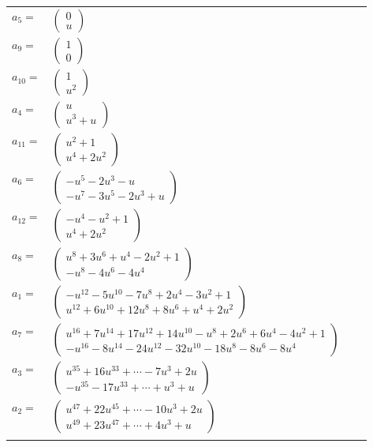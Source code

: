 \documentclass[1p]{elsarticle_modified}
\theoremstyle{definition}
\begin{document}
\begin{tabular}{m{7pt} m{180pt} m{7pt} m{180pt} }
\flushright $a_{5}=$&$\begin{pmatrix}0\\u\end{pmatrix}$ \\
\flushright $a_{9}=$&$\begin{pmatrix}1\\0\end{pmatrix}$ \\
\flushright $a_{10}=$&$\begin{pmatrix}1\\u^2\end{pmatrix}$ \\
\flushright $a_{4}=$&$\begin{pmatrix}u\\u^3+u\end{pmatrix}$ \\
\flushright $a_{11}=$&$\begin{pmatrix}u^2+1\\u^4+2 u^2\end{pmatrix}$ \\
\flushright $a_{6}=$&$\begin{pmatrix}- u^5-2 u^3- u\\- u^7-3 u^5-2 u^3+u\end{pmatrix}$ \\
\flushright $a_{12}=$&$\begin{pmatrix}- u^4- u^2+1\\u^4+2 u^2\end{pmatrix}$ \\
\flushright $a_{8}=$&$\begin{pmatrix}u^8+3 u^6+u^4-2 u^2+1\\- u^8-4 u^6-4 u^4\end{pmatrix}$ \\
\flushright $a_{1}=$&$\begin{pmatrix}- u^{12}-5 u^{10}-7 u^8+2 u^4-3 u^2+1\\u^{12}+6 u^{10}+12 u^8+8 u^6+u^4+2 u^2\end{pmatrix}$ \\
\flushright $a_{7}=$&$\begin{pmatrix}u^{16}+7 u^{14}+17 u^{12}+14 u^{10}- u^8+2 u^6+6 u^4-4 u^2+1\\- u^{16}-8 u^{14}-24 u^{12}-32 u^{10}-18 u^8-8 u^6-8 u^4\end{pmatrix}$ \\
\flushright $a_{3}=$&$\begin{pmatrix}u^{35}+16 u^{33}+\cdots-7 u^3+2 u\\- u^{35}-17 u^{33}+\cdots+u^3+u\end{pmatrix}$ \\
\flushright $a_{2}=$&$\begin{pmatrix}u^{47}+22 u^{45}+\cdots-10 u^3+2 u\\u^{49}+23 u^{47}+\cdots+4 u^3+u\end{pmatrix}$\\&\end{tabular}
\end{document}
